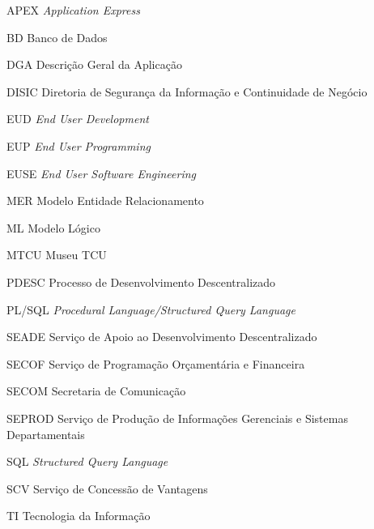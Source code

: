 \begin{siglas}
  \item [APEX] \textit{Application Express}
  \item [BD] Banco de Dados
  \item [DGA] Descrição Geral da Aplicação
  \item [DISIC] Diretoria de Segurança da Informação e Continuidade de Negócio
  \item [EUD] \textit{End User Development}
  \item [EUP] \textit{End User Programming}
  \item [EUSE] \textit{End User Software Engineering}
  \item [MER] Modelo Entidade Relacionamento
  \item [ML] Modelo Lógico
  \item [MTCU] Museu TCU
  \item [PDESC] Processo de Desenvolvimento Descentralizado
  \item [PL/SQL] \textit{Procedural Language/Structured Query Language}
  \item [SEADE] Serviço de Apoio ao Desenvolvimento Descentralizado
  \item [SECOF] Serviço de Programação Orçamentária e Financeira
  \item [SECOM] Secretaria de Comunicação
  \item [SEPROD] Serviço de Produção de Informações Gerenciais e Sistemas Departamentais
  \item [SQL] \textit{Structured Query Language}
  \item [SCV] Serviço de Concessão de Vantagens
  \item [TI] Tecnologia da Informação
\end{siglas}

